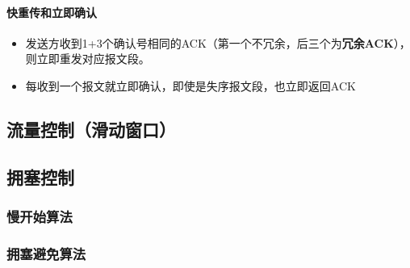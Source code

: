 \paragraph{快重传和立即确认}
\begin{itemize}
    \item 发送方收到1+3个确认号相同的ACK（第一个不冗余，后三个为\textbf{冗余ACK}），则立即重发对应报文段。
    \item 每收到一个报文就立即确认，即使是失序报文段，也立即返回ACK
\end{itemize}


\subsection{流量控制（滑动窗口）}


\subsection{拥塞控制}

\subsubsection{慢开始算法}


\subsubsection{拥塞避免算法}






















